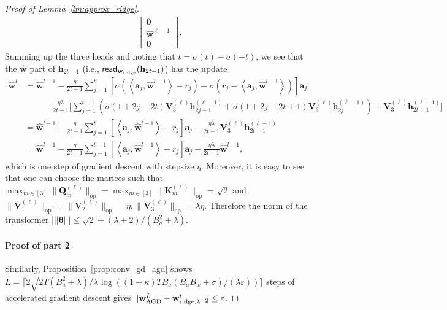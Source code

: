 \documentclass[10pt]{article}
\renewcommand{\hat}{\widehat}
\newcommand{\eps}{\varepsilon}
\newcommand{\lops}[1]{\|{#1}\|_{\mathrm{op}}}
\newcommand{\<}{\left\langle}
\renewcommand{\>}{\right\rangle}
\renewcommand{\bQ}{\mathbf{Q}}
\newcommand{\lth}{{(\ell)}}
\newcommand{\bzero}{{\mathbf 0}}
\renewcommand{\read}{{\sf read}}
\newcommand{\ridge}{{\rm ridge}}
\newcommand{\nrmp}[1]{{\left|\!\left|\!\left|{#1}\right|\!\right|\!\right|}}
\newcommand{\AGD}{{\mathrm{AGD}}}
\def\bK{{\mathbf K}}
\def\bQ{{\mathbf Q}}
\def\bV{{\mathbf V}}
\def\btheta{{\boldsymbol \theta}}
\def\ba{{\mathbf a}}
\def\bh{{\mathbf h}}
\def\bw{{\mathbf w}}
\begin{document}
\begin{proof}[Proof of Lemma~\ref{lm:approx_ridge}]
\begin{align*}
\begin{bmatrix}
        \bzero\\ \hat\bw^{\ell-1}\\ \bzero
    \end{bmatrix}.
\end{align*}
Summing up the three heads and noting that $t=\sigma(t)-\sigma(-t)$, we see that the $\hat\bw$ part of $\bh_{2t-1}$ (i.e., $\read_{\bw_\ridge}(\bh_{2t-1})$) has the update
\begin{align*}
    \hat\bw^{l}
    &=\hat\bw^{l-1}-\frac{\eta}{2t-1}\sum_{j=1}^t[\sigma(\<\ba_j,\hat\bw^{l-1}\>-r_j)-\sigma(r_j-\<\ba_j,\hat\bw^{l-1}\>)]\ba_j\\&
    \qquad
    -\frac{\eta\lambda}{2t-1}\Big[\sum_{j=1}^{t-1}(\sigma(1+2j-2t)\bV_3^{(\ell)}\bh^{(\ell-1)}_{2j-1}+\sigma(1+2j-2t+1)\bV_3^{(\ell)}\bh^{(\ell-1)}_{2j})+
   \bV_3^{(\ell)}\bh^{(\ell-1)}_{2t-1}\Big]\\
     &=\hat\bw^{l-1}-\frac{\eta}{2t-1}\sum_{j=1}^t[\<\ba_j,\hat\bw^{l-1}\>-r_j]\ba_j-\frac{\eta\lambda}{2t-1}\bV_3^{(\ell)}\bh^{(\ell-1)}_{2t-1}\\
     &=\hat\bw^{l-1}-\frac{\eta}{2t-1}\sum_{j=1}^{t-1}[\<\ba_j,\hat\bw^{l-1}\>-r_j]\ba_j-\frac{\eta\lambda}{2t-1}\hat\bw^{l-1},
\end{align*}
which is one step of gradient descent with stepsize $\eta$.  Moreover, it is easy to see that one can choose the marices such that $\max_{m\in[3]}\lops{\bQ^\lth_m}=\max_{m\in[3]}\lops{\bK^\lth_m}=\sqrt{2}$ and $\lops{\bV^\lth_1}=\lops{\bV^\lth_2}=\eta,\lops{\bV^\lth_3}= \lambda\eta$. Therefore the norm of the transformer $\nrmp{\btheta}\leq \sqrt{2}+(\lambda+2)/(B_a^2+\lambda)$.


\paragraph{Proof of part 2}
Similarly,  Proposition~\ref{prop:conv_gd_agd} shows $L=\lceil2\sqrt{2T(B_a^2+\lambda)/\lambda}\log((1+\kappa){TB_a(B_aB_w+\sigma)}/({\lambda}\eps))\rceil$ steps of accelerated gradient descent gives  $\|\bw^L_{\AGD}-\bw^t_{\ridge,\lambda}\|_2\leq\eps$. 


\end{proof}
\end{document}
